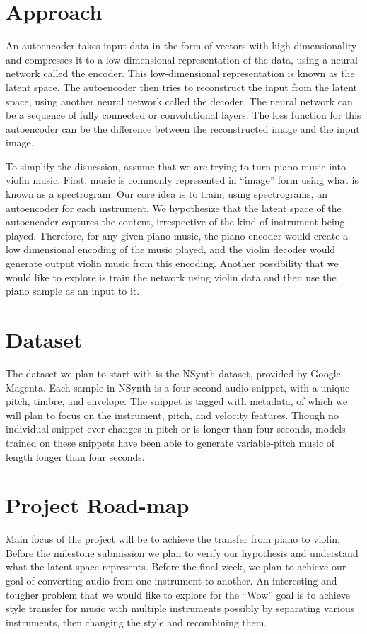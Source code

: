 \documentclass{article}
\begin{document}
\section{Approach}

An autoencoder takes input data in the form of vectors with high dimensionality and compresses it to a low-dimensional representation of the data, using a neural network called the encoder. This low-dimensional representation is known as the latent space. The autoencoder then tries to reconstruct the input from the latent space, using another neural network called the decoder. The neural network can be a sequence of fully connected or convolutional layers. The loss function for this autoencoder can be the difference between the reconstructed image and the input image.

To simplify the disucssion, assume that we are trying to turn piano music into violin music. First, music is commonly represented in ``image'' form using what is known as a spectrogram.  Our core idea is to train, using spectrograms, an autoencoder for each instrument. We hypothesize that the latent space of the autoencoder captures the content, irrespective of the kind of instrument being played. Therefore, for any given piano music, the piano encoder would create a low dimensional encoding of the music played, and the violin decoder would generate output violin music from this encoding. Another possibility that we would like to explore is train the network using violin data and then use the piano sample as an input to it. 

\section{Dataset}

The dataset we plan to start with is the NSynth dataset\cite{nsynth2017}, provided by Google Magenta. Each sample in NSynth is a four second audio snippet, with a unique pitch, timbre, and envelope. The snippet is tagged with metadata, of which we will plan to focus on the instrument, pitch, and velocity features.  Though no individual snippet ever changes in pitch or is longer than four seconds, models trained on these snippets have been able to generate variable-pitch music of length longer than four seconds.

\section{Project Road-map}

Main focus of the project will be to achieve the transfer from piano to violin. Before the milestone submission we plan to verify our hypothesis and understand what the latent space represents. Before the final week, we plan to achieve our goal of converting audio from one instrument to another. An interesting and tougher problem that we would like to explore for the ``Wow'' goal is to achieve style transfer for music with multiple instruments possibly by separating various instruments, then changing the style and recombining them.



\end{document}
